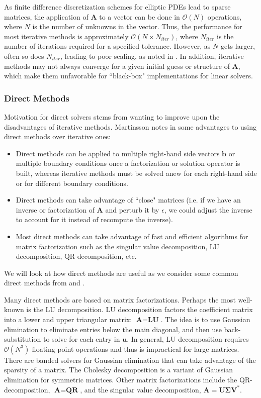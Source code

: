 As finite difference discretization schemes for elliptic PDEs lead to sparse matrices, the application of $\textbf{A}$ to a vector can be done in $\mathcal{O}(N)$ operations, where $N$ is the number of unknowns in the vector. Thus, the performance for most iterative methods is approximately $\mathcal{O}(N \times N_{iter})$, where $N_{iter}$ is the number of iterations required for a specified tolerance. However, as $N$ gets larger, often so does $N_{iter}$, leading to poor scaling, as noted in \citep{martinsson2019fast}. In addition, iterative methods may not always converge for a given initial guess or structure of $\textbf{A}$, which make them unfavorable for ``black-box" implementations for linear solvers.

\subsubsection{Direct Methods}
\label{sub:direct-methods}

Motivation for direct solvers stems from wanting to improve upon the disadvantages of iterative methods. Martinsson notes in \citep{martinsson2004fast} some advantages to using direct methods over iterative ones:
\begin{itemize}
    \item Direct methods can be applied to multiple right-hand side vectors $\textbf{b}$ or multiple boundary conditions once a factorization or solution operator is built, whereas iterative methods must be solved anew for each right-hand side or for different boundary conditions.

    \item Direct methods can take advantage of ``close" matrices (i.e. if we have an inverse or factorization of $\textbf{A}$ and perturb it by $\epsilon$, we could adjust the inverse to account for it instead of recompute the inverse).

    \item Most direct methods can take advantage of fast and efficient algorithms for matrix factorization such as the singular value decomposition, LU decomposition, QR decomposition, etc.
\end{itemize}
We will look at how direct methods are useful as we consider some common direct methods from \citep{leveque2007finite} and \citep{trefethen1997numerical}.

Many direct methods are based on matrix factorizations. Perhaps the most well-known is the LU decomposition. LU decomposition factors the coefficient matrix into a lower and upper triangular matrix: $\textbf{A} = \textbf{L} \textbf{U}$. The idea is to use Gaussian elimination to eliminate entries below the main diagonal, and then use back-substitution to solve for each entry in $\textbf{u}$. In general, LU decomposition requires $\mathcal{O}(N^3)$ floating point operations and thus is impractical for large matrices. There are banded solvers for Gaussian elimination that can take advantage of the sparsity of a matrix. The Cholesky decomposition is a variant of Gaussian elimination for symmetric matrices. Other matrix factorizations include the QR-decomposition, $\textbf{A} = \textbf{Q} \textbf{R}$, and the singular value decomposition, $\textbf{A} = \textbf{U} \boldsymbol{\Sigma} \textbf{V}^*$.


